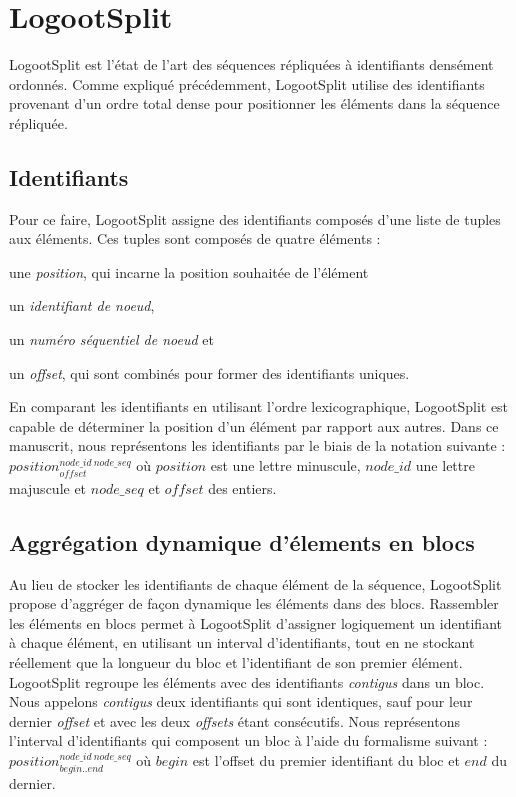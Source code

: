 \documentclass[12pt]{thesul}
\newcommand{\trm}[1]{\mathit{#1}}
\newcommand{\id}[3]{$\trm{#1}^{\trm{#2}}_{\trm{#3}}$}
\begin{document}
\section{LogootSplit}

LogootSplit \cite{AndreCollaborateCom2013} est l'état de l'art des séquences répliquées à identifiants densément ordonnés.
Comme expliqué précédemment, LogootSplit utilise des identifiants provenant d'un ordre total dense pour positionner les éléments dans la séquence répliquée.

\subsection{Identifiants}

Pour ce faire, LogootSplit assigne des identifiants composés d'une liste de tuples aux éléments.
Ces tuples sont composés de quatre éléments :
\begin{enumerate*}[label=(\roman*)]
  \item une \emph{position}, qui incarne la position souhaitée de l'élément
  \item un \emph{identifiant de noeud},
  \item un \emph{numéro séquentiel de noeud} et
  \item un \emph{offset}, qui sont combinés pour former des identifiants uniques.
\end{enumerate*}
En comparant les identifiants en utilisant l'ordre lexicographique, LogootSplit est capable de déterminer la position d'un élément par rapport aux autres.
Dans ce manuscrit, nous représentons les identifiants par le biais de la notation suivante : \id{position}{node\_id~node\_seq}{offset} où $\trm{position}$ est une lettre minuscule, $\trm{node\_id}$ une lettre majuscule et $\trm{node\_seq}$ et $\trm{offset}$ des entiers.

\subsection{Aggrégation dynamique d'élements en blocs}

Au lieu de stocker les identifiants de chaque élément de la séquence, LogootSplit propose d'aggréger de façon dynamique les éléments dans des blocs.
Rassembler les éléments en blocs permet à LogootSplit d'assigner logiquement un identifiant à chaque élément, en utilisant un interval d'identifiants, tout en ne stockant réellement que la longueur du bloc et l'identifiant de son premier élément.
LogootSplit regroupe les éléments avec des identifiants \emph{contigus} dans un bloc.
Nous appelons \emph{contigus} deux identifiants qui sont identiques, sauf pour leur dernier \emph{offset} et avec les deux \emph{offsets} étant consécutifs.
Nous représentons l'interval d'identifiants qui composent un bloc à l'aide du formalisme suivant : \id{position}{node\_id~node\_seq}{begin..end} où $\trm{begin}$ est l'offset du premier identifiant du bloc et $\trm{end}$ du dernier.
\end{document}
